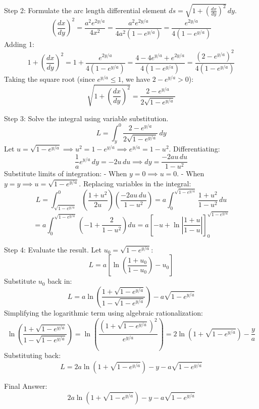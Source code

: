 \documentclass{article}
\begin{document}
Step 2: Formulate the arc length differential element \(ds = \sqrt{1 + \left(\frac{dx}{dy}\right)^2} \, dy\).
\[
\left(\frac{dx}{dy}\right)^2 = \frac{a^2 e^{2y/a}}{4x^2} = \frac{a^2 e^{2y/a}}{4a^2(1-e^{y/a})} = \frac{e^{2y/a}}{4(1-e^{y/a})}
\]
Adding 1:
\[
1 + \left(\frac{dx}{dy}\right)^2 = 1 + \frac{e^{2y/a}}{4(1-e^{y/a})} = \frac{4 - 4e^{y/a} + e^{2y/a}}{4(1-e^{y/a})} = \frac{(2-e^{y/a})^2}{4(1-e^{y/a})}
\]
Taking the square root (since \(e^{y/a} \le 1\), we have \(2-e^{y/a} > 0\)):
\[
\sqrt{1 + \left(\frac{dx}{dy}\right)^2} = \frac{2-e^{y/a}}{2\sqrt{1-e^{y/a}}}
\]

Step 3: Solve the integral using variable substitution.
\[
L = \int_{y}^0 \frac{2-e^{y/a}}{2\sqrt{1-e^{y/a}}} \, dy
\]
Let \(u = \sqrt{1-e^{y/a}} \implies u^2 = 1-e^{y/a} \implies e^{y/a} = 1-u^2\).
Differentiating:
\[
\frac{1}{a} e^{y/a} \, dy = -2u \, du \implies dy = \frac{-2au \, du}{1-u^2}
\]
Substitute limits of integration:
- When \(y = 0 \implies u = 0\).
- When \(y = y \implies u = \sqrt{1-e^{y/a}}\).
Replacing variables in the integral:
\[
L = \int_{\sqrt{1-e^{y/a}}}^0 \left( \frac{1+u^2}{2u} \right) \left( \frac{-2au \, du}{1-u^2} \right) = a \int_0^{\sqrt{1-e^{y/a}}} \frac{1+u^2}{1-u^2} \, du
\]
\[
= a \int_0^{\sqrt{1-e^{y/a}}} \left( -1 + \frac{2}{1-u^2} \right) du = a \left[ -u + \ln\left| \frac{1+u}{1-u} \right| \right]_0^{\sqrt{1-e^{y/a}}}
\]

Step 4: Evaluate the result.
Let \(u_0 = \sqrt{1-e^{y/a}}\):
\[
L = a \left[ \ln\left( \frac{1+u_0}{1-u_0} \right) - u_0 \right]
\]
Substitute \(u_0\) back in:
\[
L = a \ln\left( \frac{1+\sqrt{1-e^{y/a}}}{1-\sqrt{1-e^{y/a}}} \right) - a\sqrt{1-e^{y/a}}
\]
Simplifying the logarithmic term using algebraic rationalization:
\[
\ln\left( \frac{1+\sqrt{1-e^{y/a}}}{1-\sqrt{1-e^{y/a}}} \right) = \ln\left( \frac{\left(1+\sqrt{1-e^{y/a}}\right)^2}{e^{y/a}} \right) = 2\ln\left(1+\sqrt{1-e^{y/a}}\right) - \frac{y}{a}
\]
Substituting back:
\[
L = 2a\ln\left(1+\sqrt{1-e^{y/a}}\right) - y - a\sqrt{1-e^{y/a}}
\]

Final Answer:
\[
\boxed{2a\ln\left(1+\sqrt{1-e^{y/a}}\right) - y - a\sqrt{1-e^{y/a}}}
\]
\end{document}
